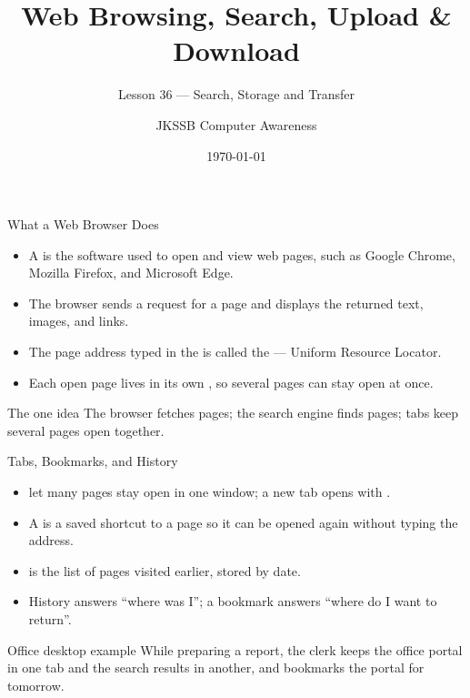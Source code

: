 \documentclass[aspectratio=169]{beamer}
\title{Web Browsing, Search, Upload \& Download}
\subtitle{Lesson 36 --- Search, Storage and Transfer}
\author{JKSSB Computer Awareness}
\date{\today}
\begin{document}
\frame{\titlepage}

\begin{frame}{What a Web Browser Does}
  \begin{itemize}
    \item A  is the software used to open and view web pages,
      such as Google Chrome, Mozilla Firefox, and Microsoft Edge.
    \item The browser sends a request for a page and displays the returned
      text, images, and links.
    \item The page address typed in the  is called the
       --- Uniform Resource Locator.
    \item Each open page lives in its own , so several pages can
      stay open at once.
  \end{itemize}
  \begin{block}{The one idea}
    The browser fetches pages; the search engine finds pages; tabs keep
    several pages open together.
  \end{block}
\end{frame}

\begin{frame}{Tabs, Bookmarks, and History}
  \begin{itemize}
    \item {} let many pages stay open in one window; a new tab opens
      with .
    \item A  is a saved shortcut to a page so it can be opened
      again without typing the address.
    \item {} is the list of pages visited earlier,
      stored by date.
    \item History answers ``where was I''; a bookmark answers ``where do I
      want to return''.
  \end{itemize}
  \begin{exampleblock}{Office desktop example}
    While preparing a report, the clerk keeps the office portal in one tab
    and the search results in another, and bookmarks the portal for tomorrow.
  \end{exampleblock}
\end{frame}
\end{document}
